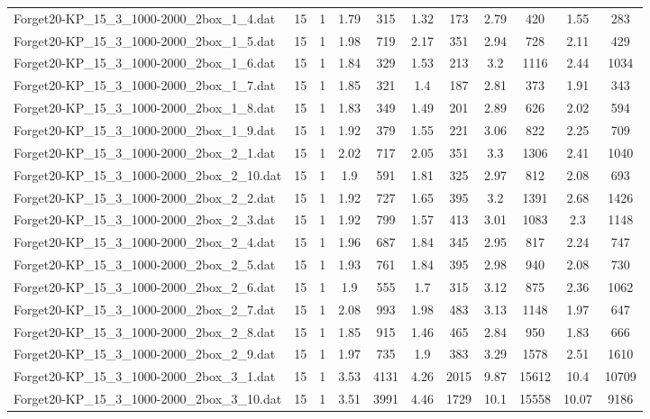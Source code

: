 \begin{table}[!ht]
\begin{tabular}{lcccccccccc}
Forget20-KP\_15\_3\_1000-2000\_2box\_1\_4.dat & 15 & 1 & 1.79 & 315 & 1.32 & 173 & 2.79 & 420 & 1.55 & 283 \\
Forget20-KP\_15\_3\_1000-2000\_2box\_1\_5.dat & 15 & 1 & 1.98 & 719 & 2.17 & 351 & 2.94 & 728 & 2.11 & 429 \\
Forget20-KP\_15\_3\_1000-2000\_2box\_1\_6.dat & 15 & 1 & 1.84 & 329 & 1.53 & 213 & 3.2 & 1116 & 2.44 & 1034 \\
Forget20-KP\_15\_3\_1000-2000\_2box\_1\_7.dat & 15 & 1 & 1.85 & 321 & 1.4 & 187 & 2.81 & 373 & 1.91 & 343 \\
Forget20-KP\_15\_3\_1000-2000\_2box\_1\_8.dat & 15 & 1 & 1.83 & 349 & 1.49 & 201 & 2.89 & 626 & 2.02 & 594 \\
Forget20-KP\_15\_3\_1000-2000\_2box\_1\_9.dat & 15 & 1 & 1.92 & 379 & 1.55 & 221 & 3.06 & 822 & 2.25 & 709 \\
Forget20-KP\_15\_3\_1000-2000\_2box\_2\_1.dat & 15 & 1 & 2.02 & 717 & 2.05 & 351 & 3.3 & 1306 & 2.41 & 1040 \\
Forget20-KP\_15\_3\_1000-2000\_2box\_2\_10.dat & 15 & 1 & 1.9 & 591 & 1.81 & 325 & 2.97 & 812 & 2.08 & 693 \\
Forget20-KP\_15\_3\_1000-2000\_2box\_2\_2.dat & 15 & 1 & 1.92 & 727 & 1.65 & 395 & 3.2 & 1391 & 2.68 & 1426 \\
Forget20-KP\_15\_3\_1000-2000\_2box\_2\_3.dat & 15 & 1 & 1.92 & 799 & 1.57 & 413 & 3.01 & 1083 & 2.3 & 1148 \\
Forget20-KP\_15\_3\_1000-2000\_2box\_2\_4.dat & 15 & 1 & 1.96 & 687 & 1.84 & 345 & 2.95 & 817 & 2.24 & 747 \\
Forget20-KP\_15\_3\_1000-2000\_2box\_2\_5.dat & 15 & 1 & 1.93 & 761 & 1.84 & 395 & 2.98 & 940 & 2.08 & 730 \\
Forget20-KP\_15\_3\_1000-2000\_2box\_2\_6.dat & 15 & 1 & 1.9 & 555 & 1.7 & 315 & 3.12 & 875 & 2.36 & 1062 \\
Forget20-KP\_15\_3\_1000-2000\_2box\_2\_7.dat & 15 & 1 & 2.08 & 993 & 1.98 & 483 & 3.13 & 1148 & 1.97 & 647 \\
Forget20-KP\_15\_3\_1000-2000\_2box\_2\_8.dat & 15 & 1 & 1.85 & 915 & 1.46 & 465 & 2.84 & 950 & 1.83 & 666 \\
Forget20-KP\_15\_3\_1000-2000\_2box\_2\_9.dat & 15 & 1 & 1.97 & 735 & 1.9 & 383 & 3.29 & 1578 & 2.51 & 1610 \\
Forget20-KP\_15\_3\_1000-2000\_2box\_3\_1.dat & 15 & 1 & 3.53 & 4131 & 4.26 & 2015 & 9.87 & 15612 & 10.4 & 10709 \\
Forget20-KP\_15\_3\_1000-2000\_2box\_3\_10.dat & 15 & 1 & 3.51 & 3991 & 4.46 & 1729 & 10.1 & 15558 & 10.07 & 9186 \\

\end{tabular}
\end{table}
